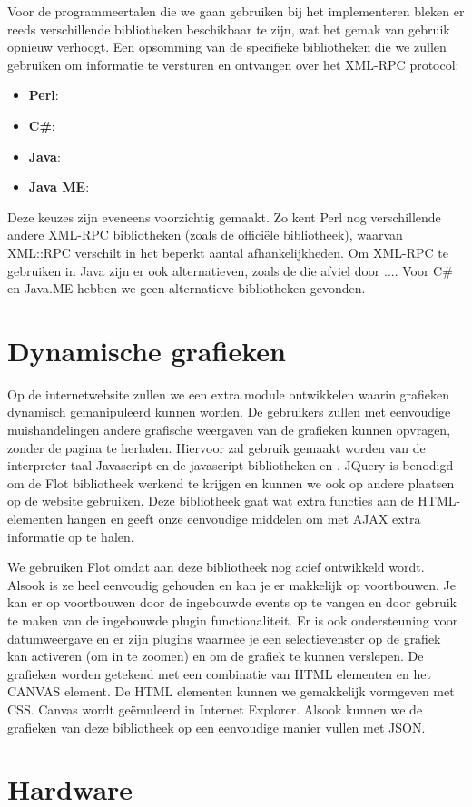 Voor de programmeertalen die we gaan gebruiken bij het implementeren bleken er reeds verschillende bibliotheken beschikbaar te zijn, wat het gemak van gebruik opnieuw verhoogt. Een opsomming van de specifieke bibliotheken die we zullen gebruiken om informatie te versturen en ontvangen over het XML-RPC protocol:
\begin{itemize}
\item{\textbf{Perl}: }
\item{\textbf{C\#}: }
\item{\textbf{Java}: }
\item{\textbf{Java ME}: }
\end{itemize}

Deze keuzes zijn eveneens voorzichtig gemaakt. Zo kent Perl nog verschillende andere XML-RPC bibliotheken (zoals de officiële  bibliotheek), waarvan XML::RPC verschilt in het beperkt aantal afhankelijkheden. Om XML-RPC te gebruiken in Java zijn er ook alternatieven, zoals de  die afviel door .... Voor C\# en Java.ME hebben we geen alternatieve bibliotheken gevonden.

\section{Dynamische grafieken}

Op de internetwebsite zullen we een extra module ontwikkelen waarin grafieken dynamisch gemanipuleerd kunnen worden. De gebruikers zullen met eenvoudige muishandelingen andere grafische weergaven van de grafieken kunnen opvragen, zonder de pagina te herladen. Hiervoor zal gebruik gemaakt worden van de interpreter taal Javascript en de javascript bibliotheken  en . JQuery is benodigd om de Flot bibliotheek werkend te krijgen en kunnen we ook op andere plaatsen op de website gebruiken. Deze bibliotheek gaat wat extra functies aan de HTML-elementen hangen en geeft onze eenvoudige middelen om met AJAX extra informatie op te halen.

We gebruiken Flot omdat aan deze bibliotheek nog acief ontwikkeld wordt. Alsook is ze heel eenvoudig gehouden en kan je er makkelijk op voortbouwen. Je kan er op voortbouwen door de ingebouwde events op te vangen en door gebruik te maken van de ingebouwde plugin functionaliteit. Er is ook ondersteuning voor datumweergave en er zijn plugins waarmee je een selectievenster op de grafiek kan activeren (om in te zoomen) en om de grafiek te kunnen verslepen.
De grafieken worden getekend met een combinatie van HTML elementen en het CANVAS element. De HTML elementen kunnen we gemakkelijk vormgeven met CSS. Canvas wordt geëmuleerd in Internet Explorer. Alsook kunnen we de grafieken van deze bibliotheek op een eenvoudige manier vullen met JSON.

\section{Hardware}

